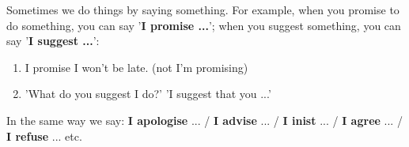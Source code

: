 \documentclass[12pt]{article}
\begin{document}
    Sometimes we do things by saying something. For example, when you promise to do something, 
    you can say '\textbf{I promise ...}'; when you suggest something, you can say '\textbf{I suggest ...}':
    \begin{enumerate}
        \item I promise I won't be late. (not I'm promising)
        \item 'What do you suggest I do?' 'I suggest that you ...'
    \end{enumerate}
    In the same way we say: \textbf{I apologise} ... / \textbf{I advise} ... / \textbf{I inist} ... / \textbf{I agree} ... /
    \textbf{I refuse} ... etc.
\end{document}
